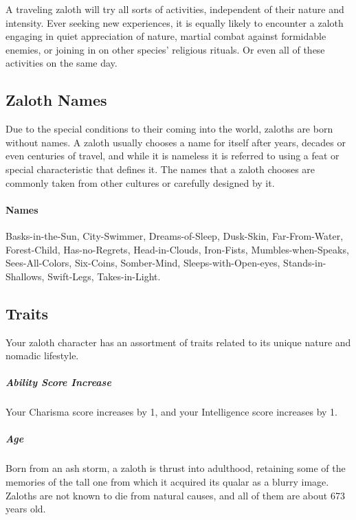     A traveling zaloth will try all sorts of activities, independent of their nature and intensity.
    Ever seeking new experiences, it is equally likely to encounter a zaloth engaging in quiet appreciation of nature, martial combat against formidable enemies, or joining in on other species' religious rituals.
    Or even all of these activities on the same day.

\subsection*{Zaloth Names}
    Due to the special conditions to their coming into the world, zaloths are born without names.
    A zaloth usually chooses a name for itself after years, decades or even centuries of travel, and while it is nameless it is referred to using a feat or special characteristic that defines it.
    The names that a zaloth chooses are commonly taken from other cultures or carefully designed by it.

    \paragraph{Names}
    Basks-in-the-Sun, City-Swimmer, Dreams-of-Sleep, Dusk-Skin, Far-From-Water, Forest-Child, Has-no-Regrets, Head-in-Clouds, Iron-Fists, Mumbles-when-Speaks, Sees-All-Colors, Six-Coins, Somber-Mind, Sleeps-with-Open-eyes, Stands-in-Shallows, Swift-Legs, Takes-in-Light.


\subsection*{Traits}
    Your zaloth character has an assortment of traits related to its unique nature and nomadic lifestyle.

    \subparagraph{Ability Score Increase}
        Your Charisma score increases by 1, and your Intelligence score increases by 1.

    \subparagraph{Age}
        Born from an ash storm, a zaloth is thrust into adulthood, retaining some of the memories of the tall one from which it acquired its qualar as a blurry image.
        Zaloths are not known to die from natural causes, and all of them are about 673 years old.

